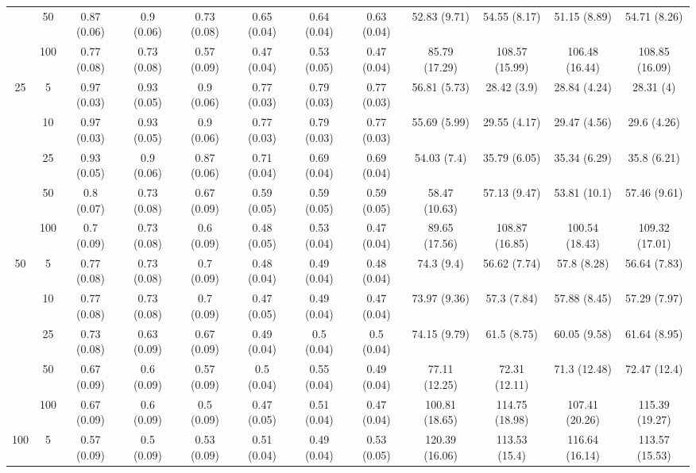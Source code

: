 \documentclass[11pt]{article}
\theoremstyle{definition}
\begin{document}
\begin{landscape}
\begin{table}[b]
\begin{center}
{\begin{tabular}{cc|ccc|ccc|cccc|}
  & 50  & 0.87 (0.06) & 0.9 (0.06) & 0.73 (0.08) & 0.65 (0.04) & 0.64 (0.04) & 0.63 (0.04) & 52.83 (9.71) & 54.55 (8.17) & 51.15 (8.89) & 54.71 (8.26) \\ 
    & 100  & 0.77 (0.08) & 0.73 (0.08) & 0.57 (0.09) & 0.47 (0.04) & 0.53 (0.05) & 0.47 (0.04) & 85.79 (17.29) & 108.57 (15.99) & 106.48 (16.44) & 108.85 (16.09)\\[.3cm]  
   \multirow{5}{*}{25} & 5  & 0.97 (0.03) & 0.93 (0.05) & 0.9 (0.06) & 0.77 (0.03) & 0.79 (0.03) & 0.77 (0.03) & 56.81 (5.73) & 28.42 (3.9) & 28.84 (4.24) & 28.31 (4) \\ 
    & 10  & 0.97 (0.03) & 0.93 (0.05) & 0.9 (0.06) & 0.77 (0.03) & 0.79 (0.03) & 0.77 (0.03) & 55.69 (5.99) & 29.55 (4.17) & 29.47 (4.56) & 29.6 (4.26) \\ 
    & 25  & 0.93 (0.05) & 0.9 (0.06) & 0.87 (0.06) & 0.71 (0.04) & 0.69 (0.04) & 0.69 (0.04) & 54.03 (7.4) & 35.79 (6.05) & 35.34 (6.29) & 35.8 (6.21) \\ 
    & 50  & 0.8 (0.07) & 0.73 (0.08) & 0.67 (0.09) & 0.59 (0.05) & 0.59 (0.05) & 0.59 (0.05) & 58.47 (10.63) & 57.13 (9.47) & 53.81 (10.1) & 57.46 (9.61) \\ 
    & 100  & 0.7 (0.09) & 0.73 (0.08) & 0.6 (0.09) & 0.48 (0.05) & 0.53 (0.04) & 0.47 (0.04) & 89.65 (17.56) & 108.87 (16.85) & 100.54 (18.43) & 109.32 (17.01) \\[.3cm] 
   \multirow{5}{*}{50} & 5  & 0.77 (0.08) & 0.73 (0.08) & 0.7 (0.09) & 0.48 (0.04) & 0.49 (0.04) & 0.48 (0.04) & 74.3 (9.4) & 56.62 (7.74) & 57.8 (8.28) & 56.64 (7.83) \\ 
    & 10  & 0.77 (0.08) & 0.73 (0.08) & 0.7 (0.09) & 0.47 (0.05) & 0.49 (0.04) & 0.47 (0.04) & 73.97 (9.36) & 57.3 (7.84) & 57.88 (8.45) & 57.29 (7.97) \\ 
    & 25  & 0.73 (0.08) & 0.63 (0.09) & 0.67 (0.09) & 0.49 (0.04) & 0.5 (0.04) & 0.5 (0.04) & 74.15 (9.79) & 61.5 (8.75) & 60.05 (9.58) & 61.64 (8.95) \\ 
    & 50  & 0.67 (0.09) & 0.6 (0.09) & 0.57 (0.09) & 0.5 (0.04) & 0.55 (0.04) & 0.49 (0.04) & 77.11 (12.25) & 72.31 (12.11) & 71.3 (12.48) & 72.47 (12.4) \\ 
    & 100  & 0.67 (0.09) & 0.6 (0.09) & 0.5 (0.09) & 0.47 (0.05) & 0.51 (0.04) & 0.47 (0.04) & 100.81 (18.65) & 114.75 (18.98) & 107.41 (20.26) & 115.39 (19.27) \\[.3cm] 
  \multirow{5}{*}{100} & 5  & 0.57 (0.09) & 0.5 (0.09) & 0.53 (0.09) & 0.51 (0.04) & 0.49 (0.04) & 0.53 (0.05) & 120.39 (16.06) & 113.53 (15.4) & 116.64 (16.14) & 113.57 (15.53) \\ 

\end{tabular}}
\end{center}
\end{table}
\end{landscape}
\end{document}
